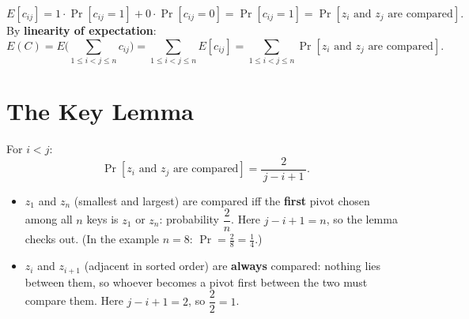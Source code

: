 \documentclass[11pt]{article}
\begin{document}
\begin{keybox}[Expected value of an indicator = its probability]
\[
  E[c_{ij}] = 1 \cdot \Pr[c_{ij} = 1] + 0 \cdot \Pr[c_{ij} = 0] = \Pr[c_{ij}=1] = \Pr[z_i \text{ and } z_j \text{ are compared}].
\]
By \textbf{linearity of expectation}:
\[
  E(C) = E\!\Big(\sum_{1 \le i < j \le n} c_{ij}\Big)
       = \sum_{1 \le i < j \le n} E[c_{ij}]
       = \sum_{1 \le i < j \le n} \Pr[z_i \text{ and } z_j \text{ are compared}].
\]
\end{keybox}

\section{The Key Lemma}

\begin{keybox}
For $i < j$:
\[
  \Pr[z_i \text{ and } z_j \text{ are compared}] = \frac{2}{\,j - i + 1\,}.
\]
\end{keybox}

\begin{examplebox}
\begin{itemize}[leftmargin=1.4em,itemsep=2pt]
  \item $z_1$ and $z_n$ (smallest and largest) are compared iff the \textbf{first} pivot chosen among all $n$ keys is $z_1$ or $z_n$: probability $\dfrac{2}{n}$. Here $j - i + 1 = n$, so the lemma checks out. (In the example $n=8$: $\Pr = \tfrac{2}{8} = \tfrac14$.)
  \item $z_i$ and $z_{i+1}$ (adjacent in sorted order) are \textbf{always} compared: nothing lies between them, so whoever becomes a pivot first between the two must compare them. Here $j - i + 1 = 2$, so $\dfrac{2}{2} = 1$. \textcolor{greenO}{\checkmark}
\end{itemize}
\end{examplebox}
\end{document}
